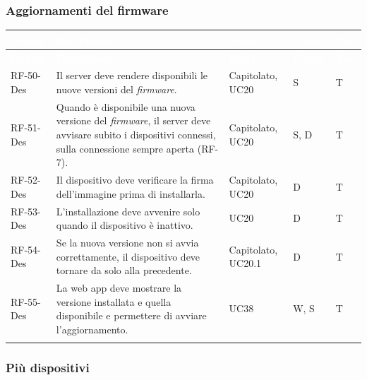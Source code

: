 \documentclass[12pt,a4paper]{article}
\newcommand{\thc}[1]{\textcolor{white}{\textbf{#1}}}
\newcommand{\rl}{\\ \arrayrulecolor{bfline}\hline}
\begin{document}
\subsubsection{Aggiornamenti del firmware}

\begin{longtable}{>{\raggedright\arraybackslash}p{}>{\raggedright\arraybackslash}p{}>{\raggedright\arraybackslash}p{}>{\raggedright\arraybackslash}p{}>{\centering\arraybackslash}p{}}
\rowcolor{bfblue}\thc{Codice} & \thc{Descrizione} & \thc{Fonti} & \thc{Comp.} & \thc{Ver.} \\
\endfirsthead
\rowcolor{bfblue}\thc{Codice} & \thc{Descrizione} & \thc{Fonti} & \thc{Comp.} & \thc{Ver.} \\
\endhead
RF-50-Des & Il server deve rendere disponibili le nuove versioni del \emph{firmware}. & Capitolato, UC20 & S & T \rl
RF-51-Des & Quando è disponibile una nuova versione del \emph{firmware}, il server deve avvisare subito i dispositivi connessi, sulla connessione sempre aperta (RF-7). & Capitolato, UC20 & S, D & T \rl
RF-52-Des & Il dispositivo deve verificare la firma dell'immagine prima di installarla. & Capitolato, UC20 & D & T \rl
RF-53-Des & L'installazione deve avvenire solo quando il dispositivo è inattivo. & UC20 & D & T \rl
RF-54-Des & Se la nuova versione non si avvia correttamente, il dispositivo deve tornare da solo alla precedente. & Capitolato, UC20.1 & D & T \rl
RF-55-Des & La web app deve mostrare la versione installata e quella disponibile e permettere di avviare l'aggiornamento. & UC38 & W, S & T \rl
\end{longtable}

\subsubsection{Più dispositivi}
\end{document}
